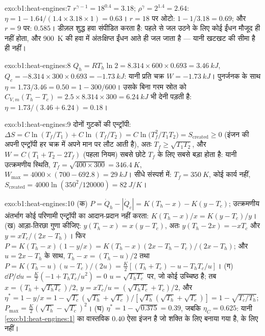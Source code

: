 \begin{solution}{exo:b1:heat-engines:7}
$r^{\gamma-1} = 18^{0.4} = 3.18$; $\rho^\gamma = 2^{1.4} = 2.64$: $\eta = 1 -
1.64/(1.4 \times 3.18 \times 1) = 0.63$। $r = 18$ पर ओटो: $1 - 1/3.18 = 0.69$;
और $r = 9$ पर: $0.585$। डीज़ल शुद्ध हवा संपीडित करता है: पहले से जल उठने के
लिए कोई ईंधन मौजूद ही नहीं होता, और \qty{900}{K} की हवा में अंतःक्षिप्त
ईंधन आते ही जल जाता है --- यानी खटखट की सीमा है ही नहीं।
\end{solution}

\begin{solution}{exo:b1:heat-engines:8}
$Q_h = RT_h\ln2 = 8.314 \times 600 \times 0.693 = \qty{3.46}{kJ}$, $Q_c = -8.314
\times 300 \times 0.693 = \qty{-1.73}{kJ}$: यानी प्रति चक्र $W = \qty{-1.73}{kJ}$।
पुनर्जनक के साथ $\eta = 1.73/3.46 = 0.50 = 1 - 300/600$। उसके बिना गरम स्रोत
को $C_{V,m}(T_h - T_c) = 2.5 \times 8.314 \times 300 =
\qty{6.24}{kJ}$ भी देनी पड़ती है: $\eta = 1.73/(3.46 + 6.24) = 0.18$।
\end{solution}

\begin{solution}{exo:b1:heat-engines:9}
दोनों गुटकों की एन्ट्रॉपी: $\Delta S = C\ln(T_f/T_1) + C\ln(T_f/T_2) =
C\ln\bigl(T_f^2/T_1T_2\bigr) = S_{\mathrm{created}} \geq 0$ (इंजन की अपनी
एन्ट्रॉपी हर चक्र में अपने मान पर लौट आती है), अतः $T_f \geq \sqrt{T_1T_2}$, और
$W = C(T_1 + T_2 - 2T_f)$ (पहला नियम) सबसे छोटे $T_f$ के लिए सबसे बड़ा होता
है: यानी उत्क्रमणीय स्थिति, $T_f = \sqrt{400 \times 300} = \qty{346.4}{K}$,
$W_{\max} = 4000 \times (700 - 692.8) = \qty{29}{kJ}$। सीधे संस्पर्श में: $T_f =
\qty{350}{K}$, कोई कार्य नहीं, $S_{\mathrm{created}} = 4000\ln(350^2/120000) =
\qty{82}{J/K}$।
\end{solution}

\begin{solution}{exo:b1:heat-engines:10}
(क) $P = \dot Q_h - |\dot Q_c| = K(T_h - x) - K(y - T_c)$; उत्क्रमणीय अंतर्भाग
कोई परिणामी एन्ट्रॉपी का आदान-प्रदान नहीं करता: $K(T_h - x)/x = K(y - T_c)/y$।
(ख) आड़ा-तिरछा गुणा कीजिए:
$y(T_h - x) = x(y - T_c)$, अतः $y(T_h - 2x) = -xT_c$ और $y = xT_c/(2x - T_h)$।
फिर $P = K(T_h - x)(1 - y/x) = K(T_h - x)(2x - T_h - T_c)/(2x - T_h)$; और
$u = 2x - T_h$ के साथ, $T_h - x = (T_h - u)/2$ तथा $P = K(T_h - u)(u - T_c)/(2u) =
\tfrac{K}{2}[(T_h + T_c) - u - T_hT_c/u]$। (ग) $\dd P/\dd u = \tfrac K2(-1 +
T_hT_c/u^2) = 0$ $u = \sqrt{T_hT_c}$ पर, जो कोई उच्चिष्ठ है; तब $x = (T_h +
\sqrt{T_hT_c})/2$, $y = xT_c/u = (\sqrt{T_hT_c} + T_c)/2$, और $\eta^\ast = 1 - y/x
= 1 - \sqrt{T_c}(\sqrt{T_h} + \sqrt{T_c})/[\sqrt{T_h}(\sqrt{T_h} + \sqrt{T_c})] = 1 -
\sqrt{T_c/T_h}$; $P_{\max} = \tfrac K2(\sqrt{T_h} - \sqrt{T_c})^2$। (घ)
$\eta^\ast = 1 - \sqrt{0.375} = 0.39$, जबकि $\eta_C = 0.625$: यानी
\cref{exo:b1:heat-engines:1} का वास्तविक $0.40$ ऐसा इंजन है जो शक्ति के
लिए बनाया गया है,  के लिए नहीं।
\end{solution}

